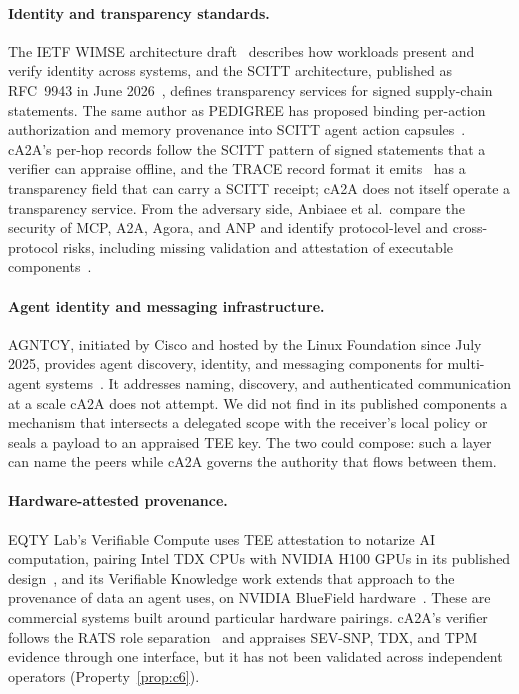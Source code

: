 \paragraph{Identity and transparency standards.}
The IETF WIMSE architecture draft~\citep{wimse2025} describes how workloads present and verify
identity across systems, and the SCITT architecture, published as RFC~9943 in June
2026~\citep{scitt2024}, defines transparency services for signed supply-chain statements. The same
author as PEDIGREE has proposed binding per-action authorization and memory provenance into SCITT
agent action capsules~\citep{capsule2026}. cA2A's per-hop records follow the SCITT pattern of
signed statements that a verifier can appraise offline, and the TRACE record format it
emits~\citep{trace2025} has a transparency field that can carry a SCITT receipt; cA2A does not
itself operate a transparency service. From the adversary side, Anbiaee et al.\ compare the security of
MCP, A2A, Agora, and ANP and identify protocol-level and cross-protocol risks, including missing
validation and attestation of executable components~\citep{crossprotocol2026}.

\paragraph{Agent identity and messaging infrastructure.}
AGNTCY, initiated by Cisco and hosted by the Linux Foundation since July 2025, provides agent
discovery, identity, and messaging components for multi-agent systems~\citep{agntcy2026}. It
addresses naming, discovery, and authenticated communication at a scale cA2A does not attempt. We
did not find in its published components a mechanism that intersects a delegated scope with the
receiver's local policy or seals a payload to an appraised TEE key. The two could compose: such a
layer can name the peers while cA2A governs the authority that flows between them.

\paragraph{Hardware-attested provenance.}
EQTY Lab's Verifiable Compute uses TEE attestation to notarize AI computation, pairing Intel TDX
CPUs with NVIDIA H100 GPUs in its published design~\citep{eqtyvc2024}, and its Verifiable
Knowledge work extends that approach to the provenance of data an agent uses, on NVIDIA BlueField
hardware~\citep{eqty2026}. These are commercial systems built around particular hardware pairings.
cA2A's verifier follows the RATS role separation~\citep{rats2021} and appraises SEV-SNP, TDX, and
TPM evidence through one interface, but it has not been validated across independent operators
(Property~\ref{prop:c6}).

